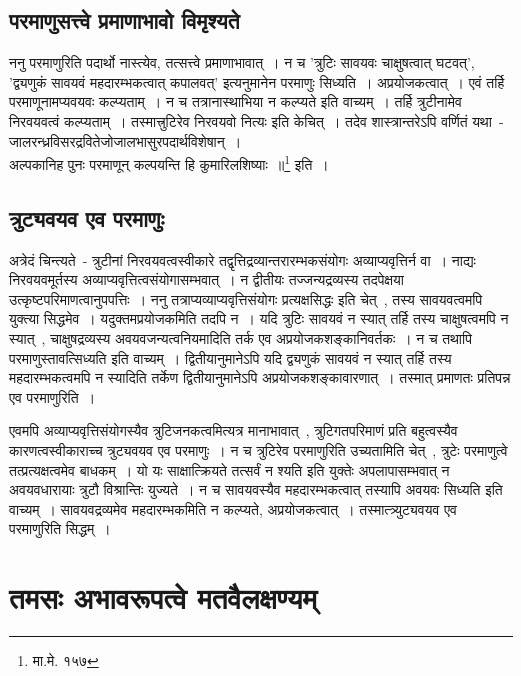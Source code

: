 		\subsection{परमाणुसत्त्वे प्रमाणाभावो विमृश्यते}

		ननु परमाणुरिति पदार्थो नास्त्येव, तत्सत्त्वे प्रमाणाभावात्~। न च 'त्रुटिः सावयवः चाक्षुषत्वात् घटवत्', 'द्व्यणुकं सावयवं महदारम्भकत्वात् कपालवत्' इत्यनुमानेन परमाणुः सिध्यति~। अप्रयोजकत्वात्~। एवं तर्हि परमाणूनामप्यवयवः कल्प्यताम्~। न च तत्रानास्थाभिया न कल्प्यते इति वाच्यम्~। तर्हि त्रुटीनामेव निरवयवत्वं कल्प्यताम्~। तस्मात्त्रुटिरेव निरवयवो नित्यः इति केचित्~। तदेव शास्त्रान्तरेऽपि वर्णितं यथा~- {\fontsize{11.7}{0}\selectfont\s जालरन्ध्रविसरद्रवितेजोजालभासुरपदार्थविशेषान्~।\\ अल्पकानिह पुनः परमाणून् कल्पयन्ति हि कुमारिलशिष्याः~॥}\footnote{मा.मे. १५७} इति~।

		\subsection{त्रुट्यवयव एव परमाणुः}

		अत्रेदं चिन्त्यते~- त्रुटीनां निरवयवत्वस्वीकारे तद्वृत्तिद्रव्यान्तरारम्भकसंयोगः अव्याप्यवृत्तिर्न वा~। नाद्यः निरवयवमूर्तस्य अव्याप्यवृत्तित्वसंयोगासम्भवात्~। न द्वीतीयः तज्जन्यद्रव्यस्य तदपेक्षया उत्कृष्टपरिमाणत्वानुपपत्तिः~। ननु  तत्राप्यव्याप्यवृत्तिसंयोगः प्रत्यक्षसिद्धः इति चेत्~, तस्य सावयवत्वमपि युक्त्या सिद्धमेव~। यदुक्तमप्रयोजकमिति तदपि न~। यदि त्रुटिः सावयवं न स्यात् तर्हि तस्य चाक्षुषत्वमपि न स्यात्~, चाक्षुषद्रव्यस्य अवयवजन्यत्वनियमादिति तर्क एव अप्रयोजकशङ्कानिवर्तकः~। न च तथापि परमाणुस्तावत्सिध्यति इति वाच्यम्~। द्वितीयानुमानेऽपि यदि द्व्यणुकं सावयवं न स्यात् तर्हि तस्य महदारम्भकत्वमपि न स्यादिति तर्केण द्वितीयानुमानेऽपि अप्रयोजकशङ्कावारणात्~। तस्मात् प्रमाणतः प्रतिपन्न एव परमाणुरिति~।

		एवमपि अव्याप्यवृत्तिसंयोगस्यैव त्रुटिजनकत्वमित्यत्र मानाभावात्~, त्रुटिगतपरिमाणं प्रति बहुत्वस्यैव कारणत्वस्वीकाराच्च त्रुट्यवयव एव परमाणुः~। न च त्रुटिरेव परमाणुरिति उच्यतामिति चेत्~, त्रुटेः परमाणुत्वे तत्प्रत्यक्षत्वमेव बाधकम्~। यो यः साक्षात्क्रियते तत्सर्वं न श्यति इति युक्तेः अपलापासम्भवात् न अवयवधारायाः त्रुटौ विश्रान्तिः युज्यते~। न च सावयवस्यैव महदारम्भकत्वात् तस्यापि अवयवः सिध्यति इति वाच्यम्~। सावयवद्रव्यमेव महदारम्भकमिति न कल्प्यते, अप्रयोजकत्वात्~। तस्मात्त्र्युट्यवयव एव परमाणुरिति सिद्धम्~।

	\section{तमसः अभावरूपत्वे मतवैलक्षण्यम्}
	
